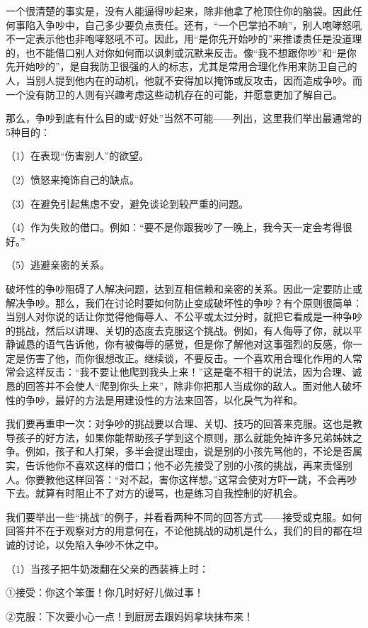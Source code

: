 \documentclass[12pt,UTF8]{ctexbook}
\begin{document}
一个很清楚的事实是，没有人能逼得吵起来，除非他拿了枪顶住你的脑袋。因此任何事陷入争吵中，自己多少要负点责任。还有，“一个巴掌拍不响”，别人咆哮怒吼不一定表示他也非咆哮怒吼不可。因此，用“是你先开始吵的”来推诿责任是没道理的，也不能借口别人对你如何而以讽刺或沉默来反击。像“我不想跟你吵”和“是你先开始吵的”，是自我防卫很强的人的标志，尤其是常用合理化作用来防卫自己的人，当别人提到他内在的动机，他就不安得加以掩饰或反攻击，因而造成争吵。而一个没有防卫的人则有兴趣考虑这些动机存在的可能，并愿意更加了解自己。

那么，争吵到底有什么目的或“好处”当然不可能——列出，这里我们举出最通常的5种目的：

（1）在表现“伤害别人”的欲望。

（2）愤怒来掩饰自己的缺点。

（3）在避免引起焦虑不安，避免谈论到较严重的问题。

（4）作为失败的借口。例如：“要不是你跟我吵了一晚上，我今天一定会考得很好。”

（5）逃避亲密的关系。

破坏性的争吵阻碍了人解决问题，达到互相信赖和亲密的关系。因此一定要防止或解决争吵。那么，我们在讨论时要如何防止变成破坏性的争吵？有个原则很简单：当别人对你说的话让你觉得他侮辱人、不公平或太过分时，就把它看成是一种争吵的挑战，然后以讲理、关切的态度去克服这个挑战。例如，有人侮辱了你，就以平静诚恳的语气告诉他，你有被侮辱的感觉，但是你了解他对这事强烈的反感，你一定是伤害了他，而你很想改正。继续谈，不要反击。一个喜欢用合理化作用的人常常会这样反击：“我不要让他爬到我头上来！”这是毫不相干的说法，因为合理、诚恳的回答并不会使人“爬到你头上来”，除非你把那人当成你的敌人。面对他人破坏性的争吵，最好的方法是用建设性的方法来回答，以化戾气为祥和。

我们要再重申一次：对争吵的挑战要以合理、关切、技巧的回答来克服。这也是教导孩子的好方法，如果你能帮助孩子学到这个原则，那么就能免掉许多兄弟姊妹之争。例如，孩子和人打架，多半会提出理由，说是别的小孩先骂他的，不论是否属实，告诉他你不喜欢这样的借口；他不必先接受了别的小孩的挑战，再来责怪别人。你要教他这样回答：“对不起，害你这样想。”这常会使对方吓一跳，不会再吵下去。就算有时阻止不了对方的谩骂，也是练习自我控制的好机会。

我们要举出一些“挑战”的例子，并看看两种不同的回答方式——接受或克服。如何回答并不在于观察对方的用意何在，不论他挑战的动机是什么，我们的目的都在坦诚的讨论，以免陷入争吵不休之中。

（1）当孩子把牛奶泼翻在父亲的西装裤上时：

①接受：你这个笨蛋！你几时好好儿做过事！

②克服：下次要小心一点！到厨房去跟妈妈拿块抹布来！
\end{document}
